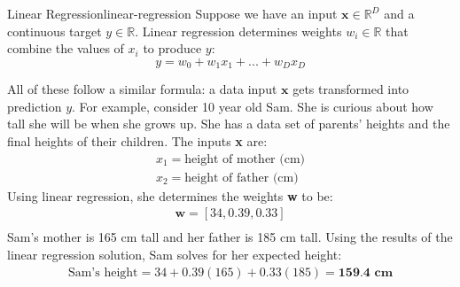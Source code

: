 \begin{definition}{Linear Regression}{linear-regression}
Suppose we have an input $\textbf{x}\in\mathbb{R}^D$ and a continuous target $y\in\mathbb{R}$.
Linear regression determines weights $w_{i}\in\mathbb{R}$ that combine the values of $x_{i}$ to produce $y$:
\begin{equation}
    y = w_{0} + w_{1}x_{1} + ... + w_{D}x_{D}
\end{equation}

\end{definition}


All of these follow a similar formula: a data input $\textbf{x}$ gets transformed into prediction $y$. For example, consider 10 year old Sam. She is curious about how tall she will be when she grows up. She has a data set of parents' heights and the final heights of their children. The inputs \textbf{x} are:
\begin{align*}
x_{1} = \text{height of mother (cm)} \\
x_{2} = \text{height of father (cm)}
\end{align*}
Using linear regression, she determines the weights \textbf{w} to be:
\begin{align*}
\textbf{w} = [34, 0.39, 0.33] \\
\end{align*}
Sam's mother is 165 cm tall and her father is 185 cm tall. Using the results of the linear regression solution, Sam solves for her expected height:
\begin{align*}
\text{Sam's height} = 34 + 0.39(165) + 0.33(185) = \textbf{159.4 cm}
\end{align*}

